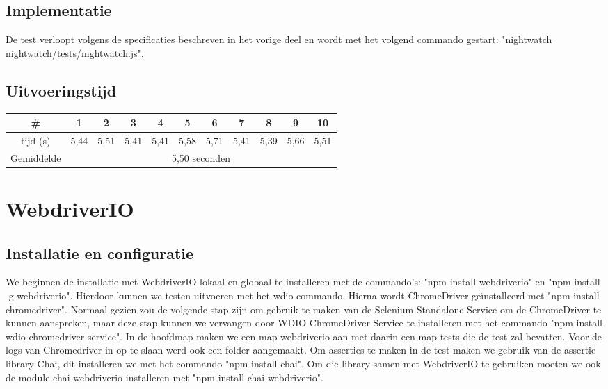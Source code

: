 \subsection{Implementatie}
De test verloopt volgens de specificaties beschreven in het vorige deel en wordt met het volgend commando gestart: "nightwatch nightwatch/tests/nightwatch.js".

\subsection{Uitvoeringstijd}

\begin{center}
\begin{tabular}{ |c| |c |c |c |c |c |c |c |c |c |c| }
\hline
	\# & 1 & 2 & 3 & 4 & 5 & 6 & 7 & 8 & 9 & 10\\
\hline
	tijd (s) & 5,44 & 5,51 & 5,41 & 5,41 & 5,58 & 5,71 & 5,41 & 5,39 & 5,66 & 5,51\\
\hline
 Gemiddelde & \multicolumn{10}{c|}{5,50 seconden}\\
\hline
\end{tabular}
\end{center}

\section{WebdriverIO}
\subsection{Installatie en configuratie}
We beginnen de installatie met WebdriverIO lokaal en globaal te installeren met de commando's: "npm install webdriverio" en "npm install -g webdriverio". Hierdoor kunnen we testen uitvoeren met het wdio commando. Hierna wordt ChromeDriver geïnstalleerd met "npm install chromedriver". Normaal gezien zou de volgende stap zijn om gebruik te maken van de Selenium Standalone Service om de ChromeDriver te kunnen aanspreken, maar deze stap kunnen we vervangen door WDIO ChromeDriver Service te installeren met het commando "npm install wdio-chromedriver-service". In de hoofdmap maken we een map webdriverio aan met daarin een map tests die de test zal bevatten. Voor de logs van Chromedriver in op te slaan werd ook een folder aangemaakt. Om asserties te maken in de test maken we gebruik van de assertie library Chai, dit installeren we met het commando "npm install chai". Om die library samen met WebdriverIO te gebruiken moeten we ook de module chai-webdriverio installeren met "npm install chai-webdriverio".

